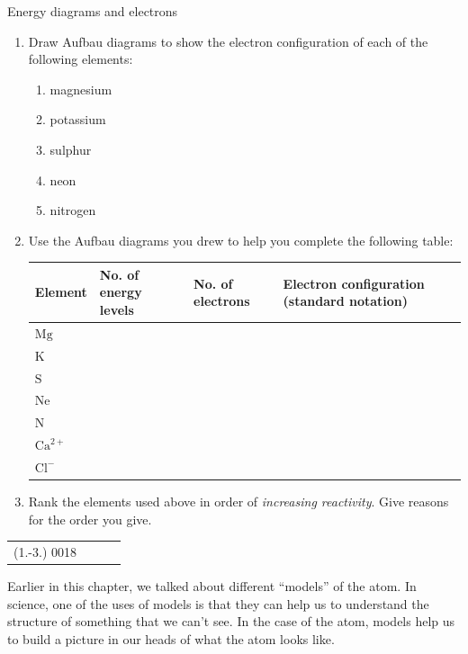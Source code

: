 \begin{exercises}{Energy diagrams and electrons}
            \nopagebreak \noindent \vspace{-2cm}
        \label{m38741*id260063}\begin{enumerate}[noitemsep, label=\textbf{\arabic*}. ] 
            \label{m38741*uid106}\item Draw Aufbau diagrams to show the electron configuration of each of the following elements:
\begin{multicols}{2}
\label{m38741*id260079}\begin{enumerate}[noitemsep, label=\textbf{\alph*}. ] 
            \label{m38741*uid107}\item magnesium
\label{m38741*uid108}\item potassium
\label{m38741*uid109}\item sulphur
\label{m38741*uid110}\item neon
\label{m38741*uid111}\item nitrogen
\end{enumerate}
\end{multicols}
        \label{m38741*uid112}\item Use the Aufbau diagrams you drew to help you complete the following table:
       \begin{center}
\begin{tabular}{|p{1.6cm}|p{2.6cm}|p{2.6cm}|p{3.4cm}|}\hline
\textbf{Element} & \textbf{No.\@{} of energy levels} & \textbf{No.\@{} of electrons}  & \textbf{Electron configuration (standard notation)}\\\hline
$\text{Mg}$ & &  & \\\hline
$\text{K}$ & &  & \\\hline
$\text{S}$ & & & \\\hline
$\text{Ne}$ &  & & \\\hline
$\text{N}$ & & & \\\hline
$\text{Ca}^{2+}$ & & & \\\hline
$\text{Cl}^{-}$ & & & \\\hline
\end{tabular}
\end{center}    
  \label{m38741*uid113}\item Rank the elements used above in order of \textsl{increasing reactivity}. Give reasons for the order you give.
 \end{enumerate}
\practiceinfo
 \par \begin{tabular}[h]{cccc}
 (1.-3.) 0018 & & & \end{tabular}
\end{exercises}            
            \label{m38741*id260472}Earlier in this chapter, we talked about different ``models'' of the atom. In science, one of the uses of models is that they can help us to understand the structure of something that we can't see. In the case of the atom, models help us to build a picture in our heads of what the atom looks like. 

